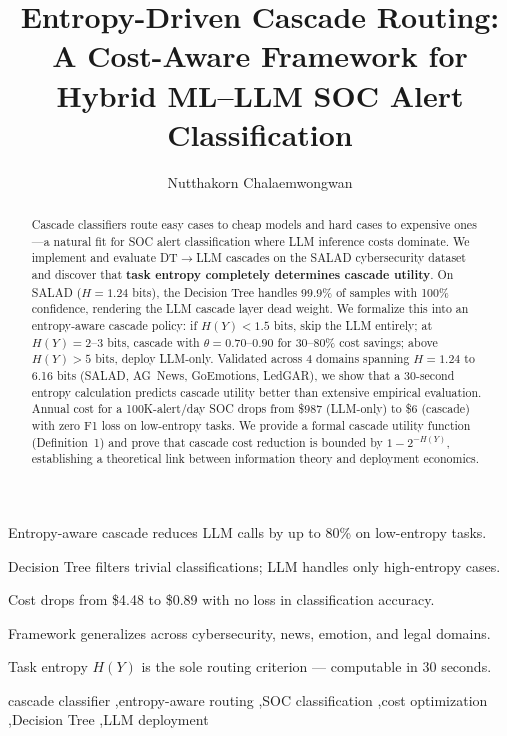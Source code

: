 \documentclass[review,3p]{elsarticle}
\begin{document}
\title{Entropy-Driven Cascade Routing: A Cost-Aware Framework for Hybrid ML--LLM SOC Alert Classification}
\author[kmitl]{Nutthakorn Chalaemwongwan}
\address[kmitl]{Department of Computer Engineering, KOSEN-KMITL, King Mongkut's Institute of Technology Ladkrabang, Bangkok, Thailand}
\begin{frontmatter}

\begin{highlights}
\item Entropy-aware cascade reduces LLM calls by up to 80\% on low-entropy tasks.
\item Decision Tree filters trivial classifications; LLM handles only high-entropy cases.
\item Cost drops from \$4.48 to \$0.89 with no loss in classification accuracy.
\item Framework generalizes across cybersecurity, news, emotion, and legal domains.
\item Task entropy $H(Y)$ is the sole routing criterion --- computable in 30 seconds.
\end{highlights}

\begin{abstract}
Cascade classifiers route easy cases to cheap models and hard cases to expensive ones---a natural fit for SOC alert classification where LLM inference costs dominate. We implement and evaluate DT$\to$LLM cascades on the SALAD cybersecurity dataset and discover that \textbf{task entropy completely determines cascade utility}. On SALAD ($H=1.24$ bits), the Decision Tree handles 99.9\% of samples with 100\% confidence, rendering the LLM cascade layer dead weight. We formalize this into an entropy-aware cascade policy: if $H(Y)<1.5$ bits, skip the LLM entirely; at $H(Y)=2$--$3$ bits, cascade with $\theta=0.70$--$0.90$ for 30--80\% cost savings; above $H(Y)>5$ bits, deploy LLM-only. Validated across 4 domains spanning $H=1.24$ to 6.16 bits (SALAD, AG~News, GoEmotions, LedGAR), we show that a 30-second entropy calculation predicts cascade utility better than extensive empirical evaluation. Annual cost for a 100K-alert/day SOC drops from \$987 (LLM-only) to \$6 (cascade) with zero F1 loss on low-entropy tasks. We provide a formal cascade utility function (Definition~1) and prove that cascade cost reduction is bounded by $1 - 2^{-H(Y)}$, establishing a theoretical link between information theory and deployment economics.
\end{abstract}
\begin{keyword}
cascade classifier \sep entropy-aware routing \sep SOC classification \sep cost optimization \sep Decision Tree \sep LLM deployment
\end{keyword}

\end{frontmatter}
\end{document}
